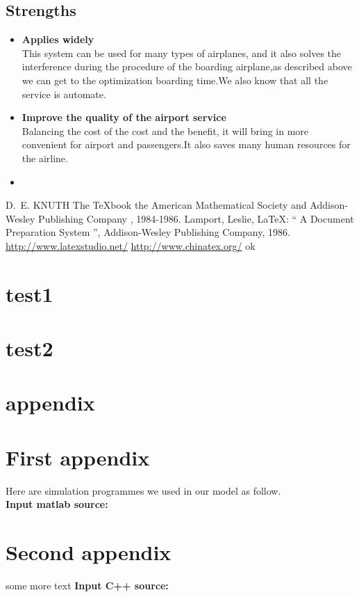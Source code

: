 \documentclass{mcmthesis}
\begin{document}
\subsection{Strengths}
\begin{itemize}
\item \textbf{Applies widely}\\
This  system can be used for many types of airplanes, and it also
solves the interference during  the procedure of the boarding
airplane,as described above we can get to the  optimization
boarding time.We also know that all the service is automate.
\item \textbf{Improve the quality of the airport service}\\
Balancing the cost of the cost and the benefit, it will bring in
more convenient  for airport and passengers.It also saves many
human resources for the airline. \item \textbf{}
\end{itemize}

\begin{thebibliography}{99}
 D.~E. KNUTH   The \TeX{}book  the American
Mathematical Society and Addison-Wesley
Publishing Company , 1984-1986.
Lamport, Leslie,  \LaTeX{}: `` A Document Preparation System '',
Addison-Wesley Publishing Company, 1986.
\url{http://www.latexstudio.net/}
\url{http://www.chinatex.org/}
ok
\end{thebibliography}


\section{test1}


\section{test2}


\section{appendix}



\begin{appendices}

\section{First appendix}


Here are simulation programmes we used in our model as follow.\\

\textbf{\textcolor[rgb]{0.98,0.00,0.00}{Input matlab source:}}


\section{Second appendix}

some more text \textcolor[rgb]{0.98,0.00,0.00}{\textbf{Input C++ source:}}


\end{appendices}
\end{document}
